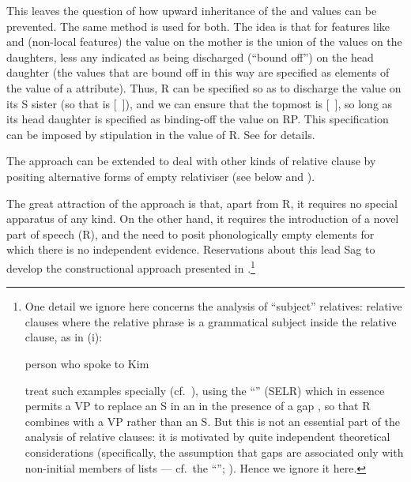 \documentclass[output=paper,nonflat,draftmode]{./langsci/langscibook}
\begin{document}
This leaves the question of how upward inheritance of the  and 
values can be prevented. The same method is used for both. The idea is that for features
like  and  (non-local features) the value on the mother is the
union of the values on the daughters, less any indicated as being discharged
(``bound off'') on the head daughter (the values that are bound off in this way are
specified as elements of the value of a  attribute). Thus, R can be specified so as to discharge the
 value on its S sister (so that  is [~\setof{}]), and we can
ensure that the topmost  is [~\setof{}], so long as its head  daughter is specified as
binding-off the  value on RP. This specification can be imposed by stipulation
in the  value of R.  See \cite[164]{Pollard:Sag:94} for details.

The approach can be extended to deal with other kinds of relative clause by positing
alternative forms of empty relativiser (see below and \citealt[Chapter~5]{Pollard:Sag:94}).

The great attraction of the approach is that, apart from R, it requires no special
apparatus of any kind. On the other hand, it requires the introduction of a novel part
of speech (R), and the need to posit phonologically empty elements for which there is no
independent evidence. Reservations about this lead Sag to develop the constructional
approach presented in \cite{Sag:97}.\footnote{\label{fn:rc-1}
One detail we ignore here concerns the analysis of ``subject'' relatives: relative clauses where
the relative phrase is a grammatical subject inside the relative clause, as in (i):
\begin{exe}
  \ex\label{x:rc-40} person who spoke to Kim 
\end{exe}
\cite{Pollard:Sag:94} treat such examples specially (cf.\
\citealt[218--219]{Pollard:Sag:94}), using the ``'' (SELR)
which in essence permits a VP to replace an S in an \feat{arg-st} in the presence of a
gap \citep[174]{Pollard:Sag:94}, so that R combines with a VP rather than an S. But this
is not an essential part of the analysis of relative clauses: it is motivated by quite
independent theoretical considerations (specifically, the assumption that gaps are
associated only with non-initial members of \feat{arg-st} lists --- cf.\ the
``\isi{Trace-Principle}''; \citealt[172]{Pollard:Sag:94}). Hence we ignore it here.}
\end{document}

